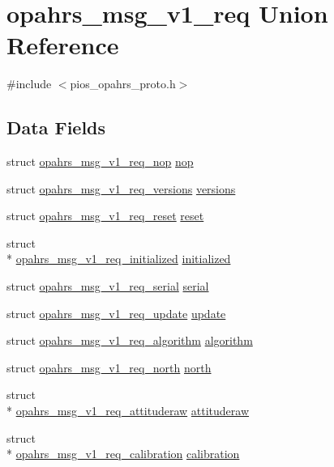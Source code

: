 \hypertarget{unionopahrs__msg__v1__req}{\section{opahrs\-\_\-msg\-\_\-v1\-\_\-req Union Reference}
\label{unionopahrs__msg__v1__req}
}


{\ttfamily \#include $<$pios\-\_\-opahrs\-\_\-proto.\-h$>$}

\subsection*{Data Fields}
\begin{DoxyCompactItemize}
\item 
struct \hyperlink{structopahrs__msg__v1__req__nop}{opahrs\-\_\-msg\-\_\-v1\-\_\-req\-\_\-nop} \hyperlink{unionopahrs__msg__v1__req_ad57def40cff11d2540a4d4684b333169}{nop}
\item 
struct \hyperlink{structopahrs__msg__v1__req__versions}{opahrs\-\_\-msg\-\_\-v1\-\_\-req\-\_\-versions} \hyperlink{unionopahrs__msg__v1__req_a3a6779111d0e20269091f28955706cc9}{versions}
\item 
struct \hyperlink{structopahrs__msg__v1__req__reset}{opahrs\-\_\-msg\-\_\-v1\-\_\-req\-\_\-reset} \hyperlink{unionopahrs__msg__v1__req_a7dbb7f9888ecad27b75e70ec2149a18c}{reset}
\item 
struct \\*
\hyperlink{structopahrs__msg__v1__req__initialized}{opahrs\-\_\-msg\-\_\-v1\-\_\-req\-\_\-initialized} \hyperlink{unionopahrs__msg__v1__req_a24e3c1cb6c682e83d40e878af812093d}{initialized}
\item 
struct \hyperlink{structopahrs__msg__v1__req__serial}{opahrs\-\_\-msg\-\_\-v1\-\_\-req\-\_\-serial} \hyperlink{unionopahrs__msg__v1__req_a5651db17b6550a51470cba2d37477115}{serial}
\item 
struct \hyperlink{structopahrs__msg__v1__req__update}{opahrs\-\_\-msg\-\_\-v1\-\_\-req\-\_\-update} \hyperlink{unionopahrs__msg__v1__req_a10863c5968cf591f030dc0ee55952665}{update}
\item 
struct \hyperlink{structopahrs__msg__v1__req__algorithm}{opahrs\-\_\-msg\-\_\-v1\-\_\-req\-\_\-algorithm} \hyperlink{unionopahrs__msg__v1__req_a40bfdd5f491c63422404a2163a0f281d}{algorithm}
\item 
struct \hyperlink{structopahrs__msg__v1__req__north}{opahrs\-\_\-msg\-\_\-v1\-\_\-req\-\_\-north} \hyperlink{unionopahrs__msg__v1__req_a24bfea89a8c0b6ce42af9d7c6a4d014c}{north}
\item 
struct \\*
\hyperlink{structopahrs__msg__v1__req__attituderaw}{opahrs\-\_\-msg\-\_\-v1\-\_\-req\-\_\-attituderaw} \hyperlink{unionopahrs__msg__v1__req_a8b47c9f9b79ebb014a60ed0f6f00d814}{attituderaw}
\item 
struct \\*
\hyperlink{structopahrs__msg__v1__req__calibration}{opahrs\-\_\-msg\-\_\-v1\-\_\-req\-\_\-calibration} \hyperlink{unionopahrs__msg__v1__req_a50a5ac629409b37aa3943a8f6a98e768}{calibration}
\end{DoxyCompactItemize}


